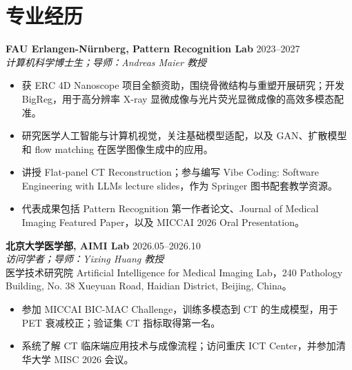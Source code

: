 \documentclass[10pt,a4paper]{article}
\begin{document}
\enlargethispage{2\baselineskip}
\section{专业经历}
\textbf{FAU Erlangen-Nürnberg, Pattern Recognition Lab} \hfill 2023--2027\\
\textit{计算机科学博士生；导师：Andreas Maier 教授}
\begin{itemize}
    \item 获 ERC 4D Nanoscope 项目全额资助，围绕骨微结构与重塑开展研究；开发 BigReg，用于高分辨率 X-ray 显微成像与光片荧光显微成像的高效多模态配准。
    \item 研究医学人工智能与计算机视觉，关注基础模型适配，以及 GAN、扩散模型和 flow matching 在医学图像生成中的应用。
    \item 讲授 Flat-panel CT Reconstruction；参与编写 Vibe Coding: Software Engineering with LLMs lecture slides，作为 Springer 图书配套教学资源。
    \item 代表成果包括 Pattern Recognition 第一作者论文、Journal of Medical Imaging Featured Paper，以及 MICCAI 2026 Oral Presentation。
\end{itemize}
\pagebreak
\textbf{北京大学医学部, AIMI Lab} \hfill 2026.05--2026.10\\
\textit{访问学者；导师：Yixing Huang 教授}\\
医学技术研究院 Artificial Intelligence for Medical Imaging Lab，240 Pathology Building, No. 38 Xueyuan Road, Haidian District, Beijing, China。
\begin{itemize}
    \item 参加 MICCAI BIC-MAC Challenge，训练多模态到 CT 的生成模型，用于 PET 衰减校正；验证集 CT 指标取得第一名。
    \item 系统了解 CT 临床端应用技术与成像流程；访问重庆 ICT Center，并参加清华大学 MISC 2026 会议。
\end{itemize}
\end{document}

